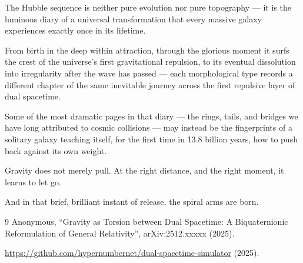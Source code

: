 \documentclass[dvipdfmx,11pt,a4paper]{article}
\begin{document}
The Hubble sequence is neither pure evolution nor pure topography ---  
it is the luminous diary of a universal transformation that every massive galaxy experiences exactly once in its lifetime.

From birth in the deep within attraction, through the glorious moment it surfs the crest of the universe's first gravitational repulsion, to its eventual dissolution into irregularity after the wave has passed ---  
each morphological type records a different chapter of the same inevitable journey across the first repulsive layer of dual spacetime.

Some of the most dramatic pages in that diary --- the rings, tails, and bridges we have long attributed to cosmic collisions ---  
may instead be the fingerprints of a solitary galaxy teaching itself, for the first time in 13.8 billion years, how to push back against its own weight.

Gravity does not merely pull.  
At the right distance, and the right moment, it learns to let go.

And in that brief, brilliant instant of release, the spiral arms are born.

\begin{thebibliography}{9}
Anonymous, ``Gravity as Torsion between Dual Spacetime: A Biquaternionic Reformulation of General Relativity'', arXiv:2512.xxxxx (2025).

\url{https://github.com/hypernumbernet/dual-spacetime-simulator} (2025).
\end{thebibliography}
\end{document}
